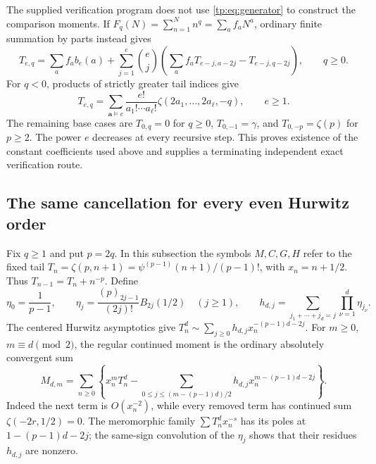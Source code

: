 The supplied verification program does not use \eqref{tp:eq:generator}
to construct the comparison moments.  If
$F_q(N)=\sum_{n=1}^N n^q=\sum_a f_aN^a$, ordinary finite summation
by parts instead gives
\begin{equation}\label{tp:eq:independentT}
 T_{e,q}=\sum_a f_ab_e(a)+
 \sum_{j=1}^e\binom ej
 \left(\sum_a f_aT_{e-j,a-2j}-T_{e-j,q-2j}\right),\qquad q\geq0.
\end{equation}
For $q<0$, products of strictly greater tail indices give
\[
 T_{e,q}=\sum_{\boldsymbol a\vDash e}
       \frac{e!}{a_1!\cdots a_\ell!}
       \zeta(2a_1,\ldots,2a_\ell,-q),\qquad e\geq1.
\]
The remaining base cases are $T_{0,q}=0$ for $q\geq0$,
$T_{0,-1}=\gamma$, and $T_{0,-p}=\zeta(p)$ for $p\geq2$.
The power $e$ decreases at every recursive step.  This proves existence
of the constant coefficients used above and supplies a terminating
independent exact verification route.

\subsection{The same cancellation for every even Hurwitz order}
\label{et:section}

Fix $q\geq1$ and put $p=2q$. In this subsection the symbols
$M,C,G,H$ refer to the fixed tail
$T_n=\zeta(p,n+1)=\psi^{(p-1)}(n+1)/(p-1)!$, with
$x_n=n+1/2$. Thus $T_{n-1}=T_n+n^{-p}$. Define
\[
 \eta_0=\frac1{p-1},\qquad
 \eta_j=\frac{(p)_{2j-1}}{(2j)!}B_{2j}(1/2)\quad(j\geq1),
 \qquad h_{d,j}=\sum_{j_1+\cdots+j_d=j}\prod_{\nu=1}^d\eta_{j_\nu}.
\]
The centered Hurwitz asymptotics give
$T_n^d\sim\sum_{j\geq0}h_{d,j}x_n^{-(p-1)d-2j}$.
For $m\geq0$, $m\equiv d\pmod2$, the regular continued moment is
the ordinary absolutely convergent sum
\begin{equation}\label{et:ordinary}
 M_{d,m}=\sum_{n\geq0}\left\{x_n^mT_n^d-
 \sum_{0\leq j\leq(m-(p-1)d)/2}
              h_{d,j}x_n^{m-(p-1)d-2j}\right\}.
\end{equation}
Indeed the next term is $O(x_n^{-2})$, while every removed term
has continued sum $\zeta(-2r,1/2)=0$. The meromorphic family
$\sum T_n^dx_n^{-s}$ has its poles at $1-(p-1)d-2j$;
the same-sign convolution of the $\eta_j$ shows that their residues
$h_{d,j}$ are nonzero.

